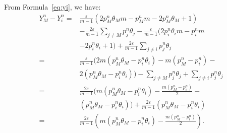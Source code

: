 \documentclass[10pt,journal,cspaper,compsoc,onecolumn]{IEEEtran}
\begin{document}
From Formula~\ref{eq:yi}, we have:
 \begin{equation}
    \begin{split}
    \label{eq:26}
    Y_M^n - Y_i^n = &\displaystyle\frac{\varepsilon}{m - 1}(2p_M^n\theta_Mm - p_M^nm - 2p_M^n\theta_M + 1)\\
    & - \displaystyle\frac{2\varepsilon}{m - 1}\sum_{j \neq M}p_j^n\theta_j - \displaystyle\frac{\varepsilon}{m - 1}(2p_i^n\theta_im - p_i^nm\\
    & - 2p_i^n\theta_i + 1) + \displaystyle\frac{2\varepsilon}{m - 1}\sum_{j \neq i}p_j^n\theta_j \\
    =&\displaystyle\frac{\varepsilon}{m - 1}(2m(p_M^n\theta_M - p_i^n\theta_i) - m(p_M^n - p_i^n) -\\
    & 2(p_M^n\theta_M - p_i^n\theta_i)) - \sum_{j \neq M}p_j^n\theta_j + \sum_{j \neq i}p_j^n\theta_j    \\
    =& \displaystyle\frac{2\varepsilon}{m - 1}(m(p_M^n\theta_M - p_i^n\theta_i) - \displaystyle\frac{m(p_M^n - p_i^n)}{2} - \\
    &(p_M^n\theta_M - p_i^n\theta_i)) + \displaystyle\frac{2\varepsilon}{m-1}(p_M^n\theta_M - p_i^n\theta_i)\\
    =&\displaystyle\frac{2\varepsilon}{m - 1}(m(p_M^n\theta_M - p_i^n\theta_i) - \displaystyle\frac{m(p_M^n - p_i^n)}{2}).
    \end{split}
\end{equation}
\end{document}

